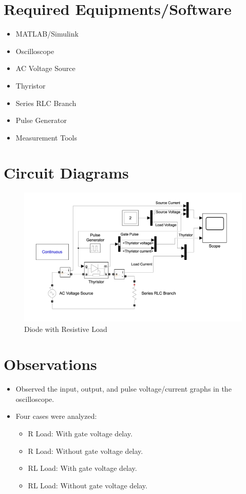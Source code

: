 \documentclass[12pt]{article}
\begin{document}
\section*{Required Equipments/Software}
\begin{itemize}
    \item MATLAB/Simulink
    \item Oscilloscope
    \item AC Voltage Source
    \item Thyristor
    \item Series RLC Branch
    \item Pulse Generator
    \item Measurement Tools
\end{itemize}

\section*{Circuit Diagrams}
\begin{figure}[H]
    \centering
    \includegraphics[width=\textwidth]{ckt.png}
    \caption{Diode with Resistive Load}
    \label{fig:dc_r_load}
\end{figure}

\section*{Observations}
\begin{itemize}
    \item Observed the input, output, and pulse voltage/current graphs in the oscilloscope.
    \item Four cases were analyzed:
          \begin{itemize}
              \item R Load: With gate voltage delay.
              \item R Load: Without gate voltage delay.
              \item RL Load: With gate voltage delay.
              \item RL Load: Without gate voltage delay.
          \end{itemize}
\end{itemize}
\end{document}

